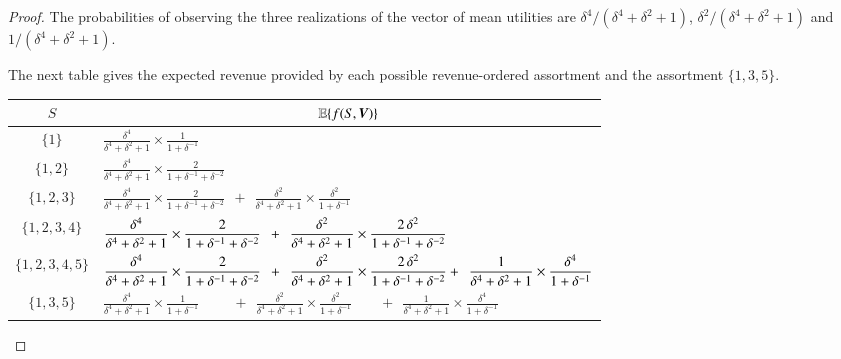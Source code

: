 \begin{proof}
\noindent The probabilities of observing the three realizations of the vector of mean utilities are $\delta^4 / (\delta^4 + \delta^2 + 1)$, $\delta^2 / (\delta^4 + \delta^2 + 1)$ and $1 / (\delta^4 + \delta^2 + 1)$. 

The next table gives the expected revenue provided by each possible revenue-ordered assortment and the assortment $\{1,3,5\}$. 



\begin{center}
\footnotesize
\begin{tabular}{cl}
\hline
$S$ & \multicolumn{1}{c}{$\mathbb E \{ f(S,{\bm V})\}$} \\
\hline
$\{1\}$ &  $\displaystyle \frac{\delta^4}{\delta^4 + \delta^2 + 1} \times \frac{1}{1 + \delta^{-1}}$
\\
$\{1,2\}$ & 
$\displaystyle \frac{\delta^4}{\delta^4 + \delta^2 + 1} \times \frac{2}{1 + \delta^{-1} + \delta^{-2}}$
\\
$\{1,2,3\}$ &
$\displaystyle \frac{\delta^4}{\delta^4 + \delta^2 + 1} \times \frac{2}{1 + \delta^{-1} + \delta^{-2}}
~~+~~
\displaystyle \frac{\delta^2}{\delta^4 + \delta^2 + 1} \times \frac{\delta^2}{1 + \delta^{-1} }
$
\\
$\{1,2,3,4\}$ &
$\displaystyle \frac{\delta^4}{\delta^4 + \delta^2 + 1} \times \frac{2}{1 + \delta^{-1} + \delta^{-2}}
~~+~~
\displaystyle \frac{\delta^2}{\delta^4 + \delta^2 + 1} \times \frac{2 {\,} \delta^2}{1 + \delta^{-1} + \delta^{-2}}
$
\\
$\{1,2,3,4,5\}$ &
$\displaystyle \frac{\delta^4}{\delta^4 + \delta^2 + 1} \times \frac{2}{1 + \delta^{-1} + \delta^{-2}}
~~+~~
\displaystyle \frac{\delta^2}{\delta^4 + \delta^2 + 1} \times \frac{2 {\,} \delta^2}{1 + \delta^{-1} + \delta^{-2}}
+~~
\displaystyle \frac{1}{\delta^4 + \delta^2 + 1} \times \frac{\delta^4}{1 + \delta^{-1}}
$
\\
$\{1,3,5\}$ &
$\displaystyle \frac{\delta^4}{\delta^4 + \delta^2 + 1} \times \frac{1}{1 + \delta^{-1}}
~~~~~~~~\,~~+~~
\displaystyle \frac{\delta^2}{\delta^4 + \delta^2 + 1} \times \frac{\delta^2}{1 + \delta^{-1}}
~~~~~~~~\,+~~
\displaystyle \frac{1}{\delta^4 + \delta^2 + 1} \times \frac{\delta^4}{1 + \delta^{-1}}
$
\\
\hline
\end{tabular}
\end{center}


\end{proof}
